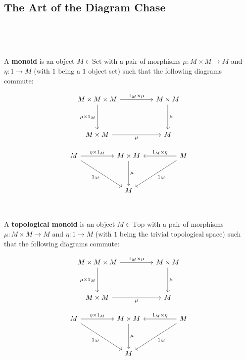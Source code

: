 \documentclass{article}
\begin{document}
\subsection{The Art of the Diagram Chase}
\

\begin{definition}[Monoid]
\

A \textbf{monoid} is an object $M \in \text{Set}$ with a pair of morphisms $\mu: M \times M \to M$ and $\eta: 1 \to M$ (with $1$ being a $1$ object set) such that the following diagrams commute:  


\[\begin{tikzcd}
	M \times M \times M &&  M \times M\\
    \\
    M\times M &&  M
    \arrow[ from=1-1, to=1-3, "1_M \times \mu"]
    \arrow[ from=1-3, to=3-3, "\mu"]
    \arrow[from=1-1, to=3-1, "\mu \times 1_M"']
    \arrow[from=3-1, to=3-3, "\mu"']
\end{tikzcd}\]


\[\begin{tikzcd}
	M &&  M \times M && M\\
    \\
    && M &&  
    \arrow[ from=1-1, to=1-3, "\eta \times 1_M"]
    \arrow[ from=1-3, to=3-3, "\mu"]
    \arrow[from=1-5, to=1-3, "1_M \times \eta"']
    \arrow[from=1-1, to=3-3, "1_M"']
    \arrow[from=1-5, to=3-3, "1_M"]
\end{tikzcd}\]
\end{definition}

\begin{definition}
\

A \textbf{topological monoid} is an object $M \in \text{Top}$ with a pair of morphisms $\mu: M \times M \to M$ and $\eta: 1 \to M$ (with $1$ being the trivial topological space) such that the following diagrams commute:  


\[\begin{tikzcd}
	M \times M \times M &&  M \times M\\
    \\
    M\times M &&  M
    \arrow[ from=1-1, to=1-3, "1_M \times \mu"]
    \arrow[ from=1-3, to=3-3, "\mu"]
    \arrow[from=1-1, to=3-1, "\mu \times 1_M"']
    \arrow[from=3-1, to=3-3, "\mu"']
\end{tikzcd}\]


\[\begin{tikzcd}
	M &&  M \times M && M\\
    \\
    && M &&  
    \arrow[ from=1-1, to=1-3, "\eta \times 1_M"]
    \arrow[ from=1-3, to=3-3, "\mu"]
    \arrow[from=1-5, to=1-3, "1_M \times \eta"']
    \arrow[from=1-1, to=3-3, "1_M"']
    \arrow[from=1-5, to=3-3, "1_M"]
\end{tikzcd}\]
\end{definition}
\end{document}
